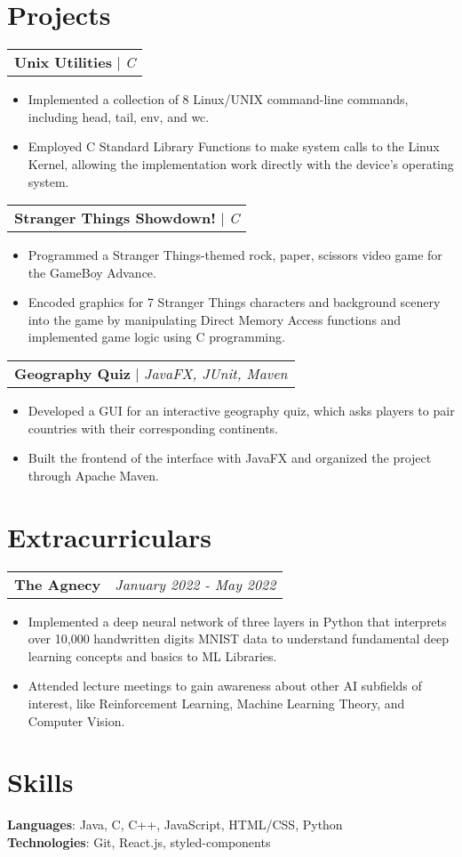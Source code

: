 \documentclass[letterpaper,11pt]{article}
\makeatletter
\newcommand{\resumeExperienceHeading}[3]{
    \begin{tabular*}{0.99\textwidth}[t]{l@{\extracolsep{\fill}}r}
      \textbf{#1} {#2} & \textit{#3} \\
    \end{tabular*}\vspace{-3pt}
}
\newcommand{\resumeProjectHeading}[2]{
    \begin{tabular*}{0.97\textwidth}[t]{l@{\extracolsep{\fill}}}
      \textbf{#1} $\vert$ \textit{#2} 
    \end{tabular*}\vspace{-3pt}
}
\newcommand{\resumeItemListStart}{\begin{itemize}[noitemsep]\vspace{-4pt}}
\newcommand{\resumeItemListEnd}{\end{itemize}}
\makeatother
\begin{document}
\section{Projects}
    \resumeProjectHeading{Unix Utilities}{C}
      \resumeItemListStart
        \item {Implemented a collection of 8 Linux/UNIX command-line commands, including head, tail, env, and wc.}
        \item {Employed C Standard Library Functions to make system calls to the Linux Kernel, allowing the implementation work directly with the device's operating system.}
      \resumeItemListEnd

    \resumeProjectHeading{Stranger Things Showdown!}{C}
      \resumeItemListStart
        \item {Programmed a Stranger Things-themed rock, paper, scissors video game for the GameBoy Advance.}
        \item {Encoded graphics for 7 Stranger Things characters and background scenery into the game by manipulating Direct Memory Access functions and implemented game logic using C programming.}
      \resumeItemListEnd

    \resumeProjectHeading{Geography Quiz}{JavaFX, JUnit, Maven}
      \resumeItemListStart
        \item {Developed a GUI for an interactive geography quiz, which asks players to pair countries with their corresponding continents.}
        \item {Built the frontend of the interface with JavaFX and organized the project through Apache Maven.}
      \resumeItemListEnd

\section{Extracurriculars}
  \resumeExperienceHeading{The Agnecy}{}{January 2022 - May 2022}
    \resumeItemListStart
      \item {Implemented a deep neural network of three layers in Python that interprets over 10,000 handwritten
      digits MNIST data to understand fundamental deep learning concepts and basics to ML Libraries.}
      \item {Attended lecture meetings to gain awareness about other AI subfields of interest, like Reinforcement
      Learning, Machine Learning Theory, and Computer Vision.}
    \resumeItemListEnd
  
\section{Skills}
    \textbf{Languages}{: Java, C, C++, JavaScript, HTML/CSS, Python} \\
    \textbf{Technologies}{: Git, React.js, styled-components} \\
\end{document}
